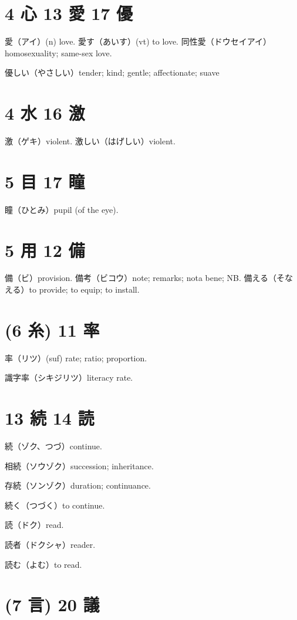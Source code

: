\section{4 心 13 愛 17 優}

愛（アイ）(n) love.
愛す（あいす）(vt) to love.
同性愛（ドウセイアイ）homosexuality; same-sex love.

優しい（やさしい）tender; kind; gentle; affectionate; suave

\section{4 水 16 激}

激（ゲキ）violent.
激しい（はげしい）violent.

\section{5 目 17 瞳}

瞳（ひとみ）pupil (of the eye).

\section{5 用 12 備}

備（ビ）provision.
備考（ビコウ）note; remarks; nota bene; NB.
備える（そなえる）to provide; to equip; to install.

\section{(6 糸) 11 率}

率（リツ）(suf) rate; ratio; proportion.

識字率（シキジリツ）literacy rate.

\section{13 続 14 読}

続（ゾク、つづ）continue.

相続（ソウゾク）succession; inheritance.

存続（ソンゾク）duration; continuance.

続く（つづく）to continue.

読（ドク）read.

読者（ドクシャ）reader.

読む（よむ）to read.

\section{(7 言) 20 議}

